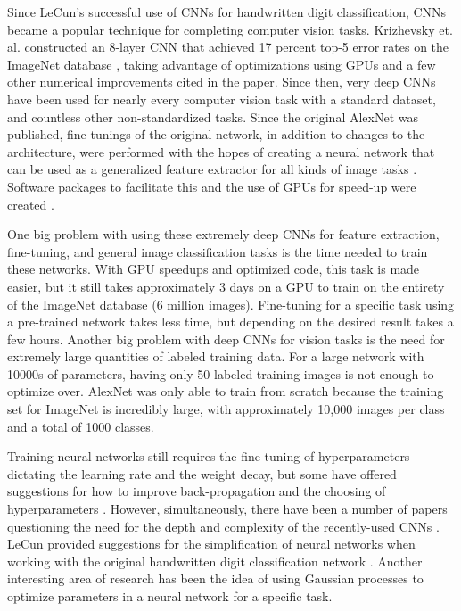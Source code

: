 \documentclass[10pt]{article}
\begin{document}
Since LeCun's successful use of CNNs for handwritten digit classification, CNNs became a popular technique for completing computer vision tasks. Krizhevsky et. al. \cite{krizhevsky_imagenet_2012} constructed an 8-layer CNN that achieved 17 percent top-5 error rates on the ImageNet database \cite{russakovsky_imagenet_2014}, taking advantage of optimizations using GPUs and a few other numerical improvements cited in the paper. Since then, very deep CNNs have been used for nearly every computer vision task with a standard dataset, and countless other non-standardized tasks. Since the original AlexNet was published, fine-tunings of the original network, in addition to changes to the architecture, were performed with the hopes of creating a neural network that can be used as a generalized feature extractor for all kinds of image tasks \cite{donahue_decaf:_2014}. Software packages to facilitate this and the use of GPUs for speed-up were created \cite{jia_caffe:_2014}. 

One big problem with using these extremely deep CNNs for feature extraction, fine-tuning, and general image classification tasks is the time needed to train these networks. With GPU speedups and optimized code, this task is made easier, but it still takes approximately 3 days on a GPU to train on the entirety of the ImageNet database (6 million images). Fine-tuning for a specific task using a pre-trained network takes less time, but depending on the desired result takes a few hours. Another big problem with deep CNNs for vision tasks is the need for extremely large quantities of labeled training data. For a large network with 10000s of parameters, having only 50 labeled training images is not enough to optimize over. AlexNet was only able to train from scratch because the training set for ImageNet is incredibly large, with approximately 10,000 images per class and a total of 1000 classes. 

Training neural networks still requires the fine-tuning of hyperparameters dictating the learning rate and the weight decay, but some have offered suggestions for how to improve back-propagation and the choosing of hyperparameters \cite{bottou_large-scale_2010}. However, simultaneously, there have been a number of papers questioning the need for the depth and complexity of the recently-used CNNs \cite{ba_deep_2013}. LeCun provided suggestions for the simplification of neural networks when working with the original handwritten digit classification network \cite{lecun_optimal_1989}. Another interesting area of research has been the idea of using Gaussian processes to optimize parameters in a neural network for a specific task. 
\end{document}
